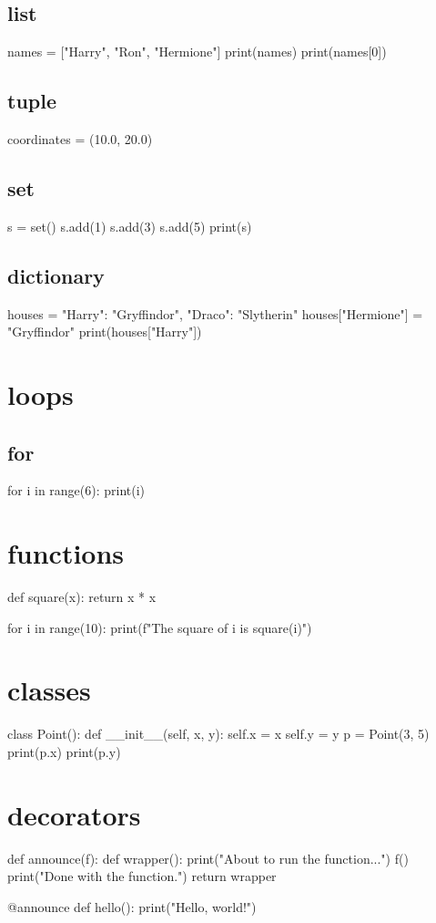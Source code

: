 \documentclass[12pt]{article}
\begin{document}
\subsection{list}
names = ["Harry", "Ron", "Hermione"]
print(names)
print(names[0])
\subsection{tuple}
coordinates = (10.0, 20.0)
\subsection{set}
s = set()
s.add(1)
s.add(3)
s.add(5)
print(s)

\subsection{dictionary}
houses = {"Harry": "Gryffindor", "Draco": "Slytherin"}
houses["Hermione"] = "Gryffindor"
print(houses["Harry"])

\section{loops}
\subsection{for}
for i in range(6):
    print(i)

\section{functions}
def square(x):
    return x * x

for i in range(10):
    print(f"The square of {i} is {square(i)}")

\section{classes}
class Point():
    def __init__(self, x, y):
        self.x = x
        self.y = y
p = Point(3, 5)
print(p.x)
print(p.y)

\section{decorators}
def announce(f):
    def wrapper():
        print("About to run the function...")
        f()
        print("Done with the function.")
    return wrapper

@announce
def hello():
    print("Hello, world!")
\end{document}
